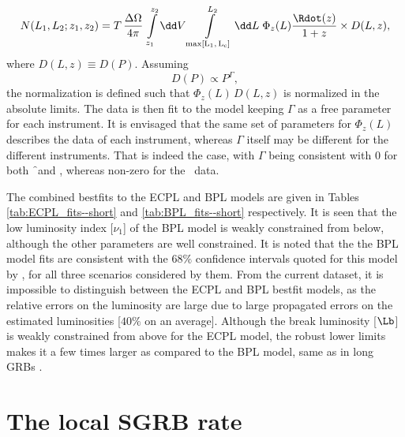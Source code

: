 \begin{equation}
N(L_1, L_2; z_1, z_2) = T \, \dfrac{\Delta \Omega}{4 \pi} \,
\intop_{z_1}^{z_2} \dd V
\intop_{\rm{max}[L_1,\, L_c]}^{L_2} \dd L \; \Phi_z(L) \dfrac{\Rdot(z)}{1+z} \times D(L, z),
\label{eq:introduction_of_D}
\end{equation} where $D(L, z) \equiv D(P)$. Assuming
\begin{equation}
D(P) \propto P^{\Gamma},
\label{eq:form_of_D}
\end{equation} the normalization is defined such that $ \Phi_z(L) \, D(L,z) $ is normalized in the absolute limits. The data is then fit to the model keeping $\Gamma$ as a free parameter for each instrument. It is envisaged that the same set of parameters for $\Phi_z(L)$ describes the data of each instrument, whereas $\Gamma$ itself may be different for the different instruments. That is indeed the case, with $\Gamma$ being consistent with $0$ for both \f\ and \s, whereas non-zero for the \B\ data.

The combined bestfits to the ECPL and BPL models are given in Tables \ref{tab:ECPL_fits--short} and \ref{tab:BPL_fits--short} respectively. It is seen that the low luminosity index [$\nu_1$] of the BPL model is weakly constrained from below, although the other parameters are well constrained. It is noted that the the BPL model fits are consistent with the $68 \%$ confidence intervals quoted for this model by , for all three scenarios considered by them. From the current dataset, it is impossible to distinguish between the ECPL and BPL bestfit models, as the relative errors on the luminosity are large due to large propagated errors on the estimated luminosities [$40 \%$ on an average]. Although the break luminosity [$\Lb$] is weakly constrained from above for the ECPL model, the robust lower limits makes it a few times larger as compared to the BPL model, same as in long GRBs .



\section{The local SGRB rate}
\label{sec:local_SGRB_rate}


